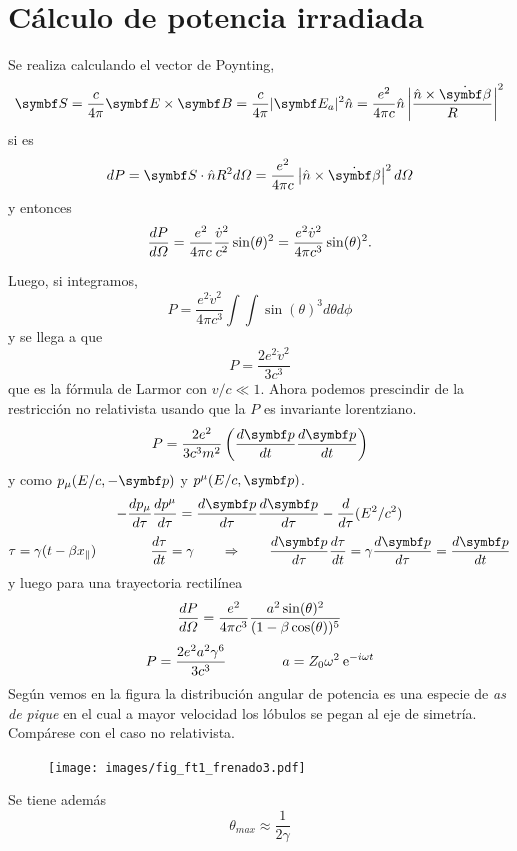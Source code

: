 \documentclass[10pt,oneside]{CBFT_book}
\begin{document}
\section{Cálculo de potencia irradiada}

Se realiza calculando el vector de Poynting,
\[
	\vb{S} = \frac{c}{4\pi} \pv{E}{B} = \frac{c}{4\pi} |\vb{E}_a|^2 \hat{n} =  \frac{e^2}{4\pi c}
		\hat{n} \left| \frac{\hat{n} \times \dot{\vb{\beta}} }{R} \right|^2
\]
si es 
\[
	dP = \vb{S}\cdot\hat{n} R^2 d\Omega =
		\frac{e^2}{4\pi c} \left| \hat{n} \times \dot{\vb{\beta}} \right|^2 d\Omega
\]
y entonces 
\[
	\frac{d^{\hspace{-0.05em}} {P}}{d {\Omega}^{\hspace{-0.05em}}} = \frac{e^2}{4\pi c} \frac{\dot{v}^2}{c^2} \sin(\theta)^2 = 
		\frac{e^2 \dot{v}^2 }{4\pi c^3} \sin(\theta)^2.
\]

Luego, si integramos,
\[
	P = \frac{e^2 \dot{v}^2 }{4\pi c^3} \int\int \sin(\theta)^3 d\theta d\phi
\]
y se llega a que 
\[
	P = \frac{2 e^2 \dot{v}^2 }{3 c^3}
\]
que es la fórmula de Larmor con $v/c \ll 1$. Ahora podemos prescindir de la restricción no relativista
usando que la $P$ es invariante lorentziano.
\[
	P = \frac{2 e^2}{3 c^3 m^2} \left( \dtot{\vb{p}}{t} \dtot{\vb{p}}{t} \right)
\]
y como $p_{\mu}( E/c , -\vb{p} )$ y $p^{\mu}( E/c , \vb{p} )$. 
\[
	-\dtot{p_\mu}{\tau} \dtot{p^\mu}{\tau} = \dtot{\vb{p}}{\tau} \dtot{\vb{p}}{\tau} - 
		\dtot{}{\tau}(E^2/c^2)
\]
\[
	\tau = \gamma (t-\beta x_\parallel) \qquad \qquad \dtot{\tau}{t} = \gamma \qquad \Rightarrow \qquad 
	\dtot{\vb{p}}{\tau} \dtot{\tau}{t}= \gamma \dtot{\vb{p}}{\tau} =  \dtot{\vb{p}}{t}
\]
y luego para una trayectoria rectilínea
\[
	\frac{d^{\hspace{-0.05em}} {P}}{d {\Omega}^{\hspace{-0.05em}}} = \frac{e^2}{4\pi c^3} \frac{ a^2 \sin(\theta)^2}{(1-\beta \cos(\theta))^5} 
\]
\[
	P = \frac{2 e^2 a^2 \gamma^6}{3 c^3} \qquad \qquad a = Z_0 \omega^2 \:\mathrm{e}^{-i \omega t}
\]
Según vemos en la figura la distribución angular de potencia es una especie de {\it as de pique} en el cual
a mayor velocidad los lóbulos se pegan al eje de simetría. Compárese con el caso no relativista.
\begin{figure}[htb]
	\begin{center}
	\texttt{[image: images/fig\_ft1\_frenado3.pdf]}	 
	\end{center}
	\caption{}
\end{figure} 

Se tiene además 
\[
	\theta_{max} \approx \frac{1}{2\gamma}
\]
\end{document}
